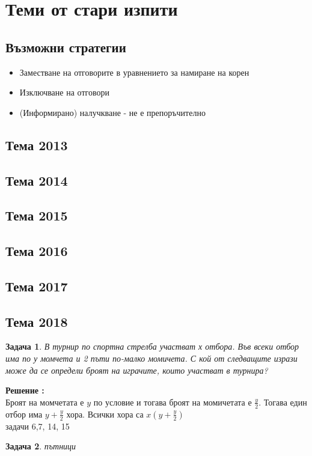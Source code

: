 \documentclass{article}
\newtheorem{problem}{Задача}
\newcounter{solution}
\newcommand\solution{%
	\stepcounter{solution}%
	\textbf{Решение :}\\%
}
\begin{document}
\section{Теми от стари изпити}
\subsection{Възможни стратегии}
\begin{itemize}
	\item Заместване на отговорите в уравнението за намиране на корен
	\item Изключване на отговори
	\item (Информирано) налучкване - не е препоръчително
\end{itemize}
\subsection{Тема 2013}
\subsection{Тема 2014}
\subsection{Тема 2015}
\subsection{Тема 2016}
\subsection{Тема 2017}
\subsection{Тема 2018}
\begin{problem}
	В турнир по спортна стрелба участват х отбора. Във всеки отбор има по у момчета и 2 пъти
	по-малко момичета. С кой от следващите изрази може да се определи броят на играчите, които
	участват в турнира?
\end{problem}
\solution Броят на момчетата е $y$ по условие и тогава броят на момичетата е $\frac{y}{2}$. Тогава един отбор има $y + \frac{y}{2}$ хора. Всички хора са $x(y+\frac{y}{2}) $ \\

задачи 6,7, 14, 15

\begin{problem}
	пътници
\end{problem}
\end{document}
